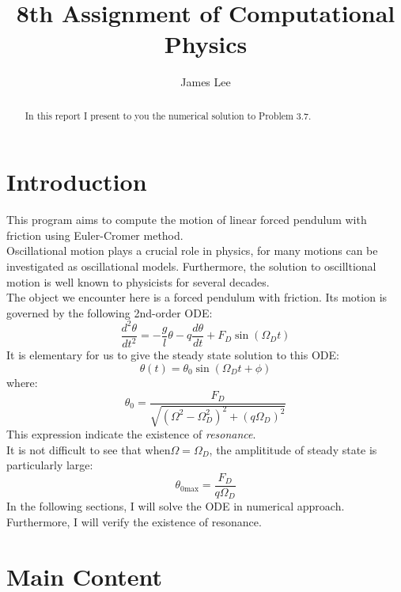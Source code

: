 \documentclass[10pt,a4paper]{article}
\author{James Lee}
\title{8th Assignment of Computational Physics}
\begin{document}
	\maketitle
	\begin{abstract}
		In this report I present to you the numerical solution to Problem 3.7.
	\end{abstract}
	\section{Introduction}
	This program aims to compute the motion of linear forced pendulum with friction using Euler-Cromer method.\\
	Oscillational motion plays a crucial role in physics, for many motions can be investigated as oscillational models. Furthermore, the solution to oscilltional motion is well known to physicists for several decades.\\
	The object we encounter here is a forced pendulum with friction. Its motion is governed by the following 2nd-order ODE:
	\begin{equation}
	\frac{d^{2}\theta}{dt^2}=-\frac{g}{l}\theta-q\frac{d\theta}{dt}+F_{D}\sin{(\Omega_Dt)}
	\end{equation}
	It is elementary for us to give the steady state solution to this ODE:
	\begin{equation}
	\theta(t)=\theta_0\sin{(\Omega_Dt+\phi)}
	\end{equation}
	where:
	\begin{equation}
	\theta_0=\frac{F_D}{\sqrt{(\Omega^2-\Omega_D^2)^2+(q\Omega_D)^2}}
	\end{equation}
	This expression indicate the existence of \emph{resonance}.\\
	It is not difficult to see that when$\Omega=\Omega_D$, the amplititude of steady state is particularly large:
	\begin{equation}
	\theta_{0\text{max}}=\frac{F_D}{q\Omega_D}
	\end{equation}
	In the following sections, I will solve the ODE in numerical approach. Furthermore, I will verify the existence of resonance.
    \section{Main Content}
\end{document}
